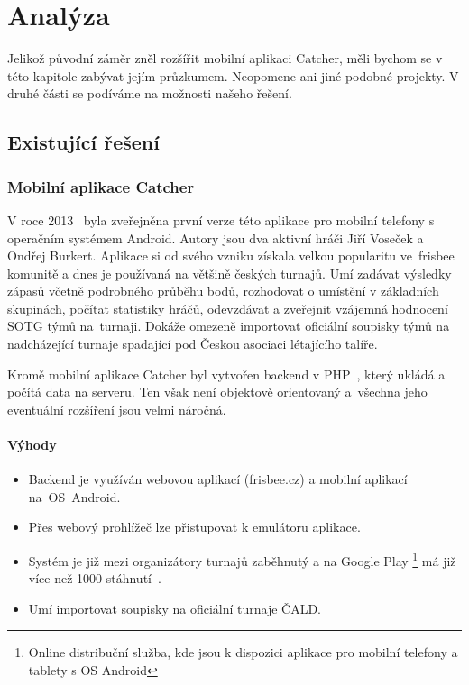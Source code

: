 \chapter{Analýza}

Jelikož původní záměr zněl rozšířit mobilní aplikaci Catcher,
měli bychom se v této kapitole zabývat jejím průzkumem. Neopomene ani jiné podobné projekty.
V druhé části se podíváme na možnosti našeho řešení.

\section{Existující řešení}

\subsection*{Mobilní aplikace Catcher}

V roce 2013~\cite{cald_catcher} byla zveřejněna první verze této aplikace pro mobilní telefony s operačním systémem Android.
Autory jsou dva aktivní hráči Jiří Voseček a Ondřej Burkert. Aplikace si od svého vzniku získala velkou popularitu
ve~frisbee komunitě a dnes je používaná na většině českých turnajů. Umí zadávat výsledky
zápasů včetně podrobného průběhu bodů, rozhodovat o umístění v základních skupinách, počítat statistiky hráčů,
odevzdávat a zveřejnit vzájemná hodnocení SOTG týmů na~turnaji. Dokáže omezeně importovat oficiální soupisky týmů
na nadcházející turnaje spadající pod Českou asociaci létajícího talíře.

Kromě mobilní aplikace Catcher byl vytvořen backend v PHP~\cite{php}, který ukládá a počítá data na serveru. Ten však není
objektově orientovaný a~všechna jeho eventuální rozšíření jsou velmi náročná.

\subsubsection*{Výhody}
\begin{itemize}
  \item Backend je využíván webovou aplikací (frisbee.cz) a mobilní aplikací na~OS~Android.
  \item Přes webový prohlížeč lze přistupovat k emulátoru aplikace.
  \item Systém je již mezi organizátory turnajů zaběhnutý a na Google Play
    \footnote{Online distribuční služba, kde jsou k dispozici aplikace pro mobilní telefony a tablety s OS Android}
    má již více než 1000 stáhnutí~\cite{catcher_play}.
  \item Umí importovat soupisky na oficiální turnaje ČALD.
\end{itemize}

